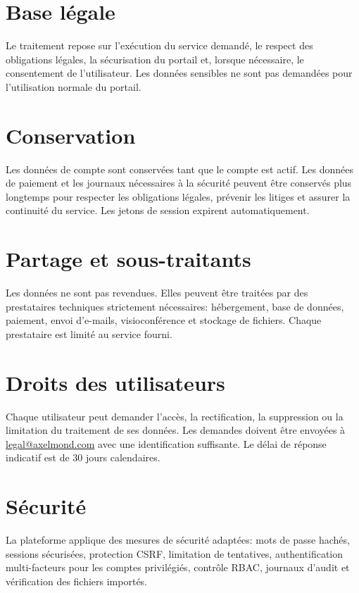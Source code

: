 \documentclass[11pt,a4paper]{article}
\begin{document}
\section{Base légale}
Le traitement repose sur l'exécution du service demandé, le respect des obligations légales, la sécurisation du portail et, lorsque nécessaire, le consentement de l'utilisateur. Les données sensibles ne sont pas demandées pour l'utilisation normale du portail.

\section{Conservation}
Les données de compte sont conservées tant que le compte est actif. Les données de paiement et les journaux nécessaires à la sécurité peuvent être conservés plus longtemps pour respecter les obligations légales, prévenir les litiges et assurer la continuité du service. Les jetons de session expirent automatiquement.

\section{Partage et sous-traitants}
Les données ne sont pas revendues. Elles peuvent être traitées par des prestataires techniques strictement nécessaires: hébergement, base de données, paiement, envoi d'e-mails, visioconférence et stockage de fichiers. Chaque prestataire est limité au service fourni.

\section{Droits des utilisateurs}
Chaque utilisateur peut demander l'accès, la rectification, la suppression ou la limitation du traitement de ses données. Les demandes doivent être envoyées à \href{mailto:legal@axelmond.com}{legal@axelmond.com} avec une identification suffisante. Le délai de réponse indicatif est de 30 jours calendaires.

\section{Sécurité}
La plateforme applique des mesures de sécurité adaptées: mots de passe hachés, sessions sécurisées, protection CSRF, limitation de tentatives, authentification multi-facteurs pour les comptes privilégiés, contrôle RBAC, journaux d'audit et vérification des fichiers importés.

\PAContactBlock
\end{document}
